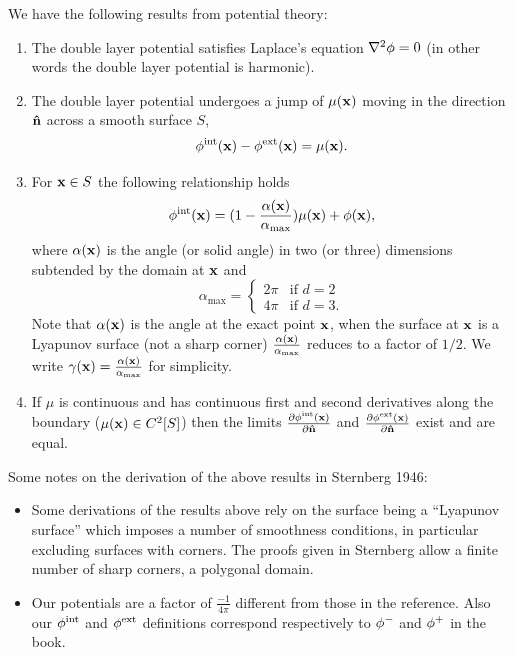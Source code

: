We have the following results from potential theory:\cite{Sternberg1946}
\begin{enumerate}
\item The double layer potential satisfies Laplace's equation $\nabla^2 \phi = 0$ (in other words the double layer potential is harmonic).%

\item The double layer potential undergoes a jump of $\mu(\mathbf{x})$ moving in the direction $\mathbf{\hat{n}}$ across a smooth surface $S$, \ie
  \begin{equation}
    \label{eq:15}
    \phi^{\text{int}}(\mathbf{x}) - \phi^{\text{ext}}(\mathbf{x}) = \mu(\mathbf{x}).
  \end{equation}

\item For $\mathbf{x} \in S$ the following relationship holds
  \begin{equation}
    \phi^{\text{int}}(\mathbf{x}) = (1 - \frac{\alpha(\mathbf{x})}{\alpha_{\text{max}}}) \mu(\mathbf{x}) + \phi(\mathbf{x}),
    \label{eq:22}
  \end{equation}
  where $\alpha(\mathbf{x})$ is the angle (or solid angle) in two (or three) dimensions subtended by the domain at $\mathbf{x}$ and
\begin{equation*}
  \alpha_{\text{max}} =
  \begin{cases}
    2 \pi & \text{if } d=2 \\
    4 \pi & \text{if } d=3.
  \end{cases}\label{eq:16}
\end{equation*}
Note that $\alpha(\mathbf{x})$ is the angle at the exact point $\mathbf{x}$, when the surface at $\mathbf{x}$ is a Lyapunov surface (\ie not a sharp corner) $\frac{\alpha(\mathbf{x})}{\alpha_{\text{max}}}$ reduces to a factor of $1/2$. We write $\gamma(\mathbf{x}) = \frac{\alpha(\mathbf{x})}{\alpha_{\text{max}}}$ for simplicity.

\item If $\mu$ is continuous and has continuous first and second derivatives along the boundary (\ie $\mu(\mathbf{x}) \in C^2[S]$) then the limits $\frac{\partial \phi^{\text{int}}(\mathbf{x})}{\partial \mathbf{\hat{n}}}$ and $\frac{\partial \phi^{\text{ext}}(\mathbf{x})}{\partial \mathbf{\hat{n}}}$ exist and are equal. %

\end{enumerate}

Some notes on the derivation of the above results in Sternberg 1946\cite{Sternberg1946}:
\begin{itemize}
\item Some derivations of the results above rely on the surface being a ``Lyapunov surface'' which imposes a number of smoothness conditions, in particular excluding surfaces with corners.
The proofs given in Sternberg allow a finite number of sharp corners, \ie a polygonal domain.
\item Our potentials are a factor of $\frac{-1}{4 \pi}$ different from those in the reference. Also our $\phi^{\text{int}}$ and $\phi^{\text{ext}}$ definitions correspond respectively to $\phi^-$ and $\phi^+$ in the book.
\end{itemize}

